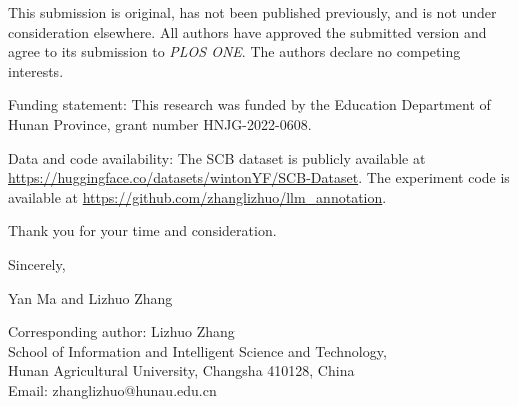 \documentclass[11pt]{article}
\begin{document}
This submission is original, has not been published previously, and is not under
consideration elsewhere. All authors have approved the submitted version and
agree to its submission to \textit{PLOS ONE}. The authors declare no competing
interests.

Funding statement: This research was funded by the Education Department of
Hunan Province, grant number HNJG-2022-0608.

Data and code availability: The SCB dataset is publicly available at
\url{https://huggingface.co/datasets/wintonYF/SCB-Dataset}. The experiment code
is available at \url{https://github.com/zhanglizhuo/llm_annotation}.

Thank you for your time and consideration.

Sincerely,

Yan Ma and Lizhuo Zhang

Corresponding author:
Lizhuo Zhang \\
School of Information and Intelligent Science and Technology, \\
Hunan Agricultural University, Changsha 410128, China \\
Email: zhanglizhuo@hunau.edu.cn
\end{document}
